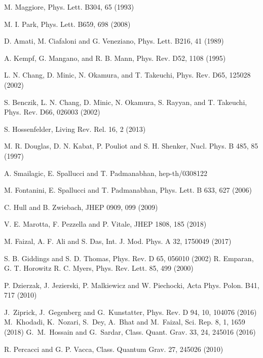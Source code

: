\documentclass[12pt]{article}
\begin{document}
\begin{thebibliography}{99}

 M. Maggiore, Phys. Lett. B304, 65 (1993)

 M. I. Park, Phys. Lett. B659, 698 (2008)


 D. Amati, M. Ciafaloni and G. Veneziano, Phys. Lett. B216, 41 (1989)

 A. Kempf, G. Mangano, and R. B. Mann, Phys. Rev. D52, 1108 (1995)


 L.  N.  Chang, D.  Minic, N. Okamura, and T.  Takeuchi, Phys. Rev. D65, 125028 (2002)

 S. Benczik, L. N.  Chang, D.  Minic, N.  Okamura, S.  Rayyan, and T.  Takeuchi,  Phys. Rev. D66, 026003 (2002)

 S. Hossenfelder, Living Rev. Rel.  16, 2  (2013) 

  M. R. Douglas, D. N. Kabat, P. Pouliot and S. H. Shenker,  Nucl. Phys. B  485, 85 (1997)

A. Smailagic, E. Spallucci and T. Padmanabhan, hep-th/0308122 

  M. Fontanini, E. Spallucci and T. Padmanabhan, Phys. Lett. B  633, 627 (2006)

 C. Hull and B. Zwiebach,  JHEP  0909, 099 (2009)

 V. E. Marotta, F. Pezzella and P. Vitale,  JHEP  1808, 185 (2018)

 M. Faizal, A. F. Ali and S. Das,  Int. J. Mod. Phys. A  32, 1750049 (2017)

S. B. Giddings and  S. D. Thomas, Phys. Rev. D 65, 056010 (2002) 
R. Emparan, G. T. Horowitz R. C. Myers,  Phys. Rev. Lett. 85, 499 (2000) 

 P.  Dzierzak, J.  Jezierski, P.  Malkiewicz and W. Piechocki,  Acta Phys. Polon. B41, 717 (2010)

J.~Ziprick, J.~Gegenberg and G.~Kunstatter, Phys. Rev. D  {94}, 10, 104076 (2016)
M.~Khodadi, K.~Nozari, S.~Dey, A.~Bhat and M.~Faizal, Sci. Rep. {8}, 1, 1659 (2018)
G.~M.~Hossain and G.~Sardar,
Class. Quant. Grav. {33}, 24, 245016 (2016)


 R. Percacci  and G. P. Vacca, Class. Quantum Grav. 27, 245026 (2010)


\end{thebibliography}
\end{document}
